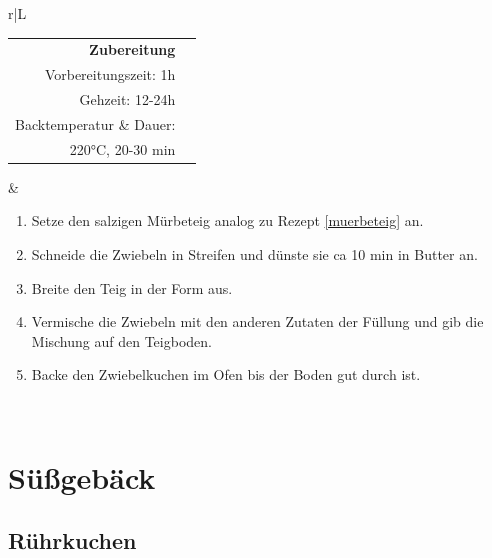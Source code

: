 \documentclass[a4paper, 12pt]{scrbook} 								%
\numberwithin{equation}{section} 									%
\begin{document}
\begin{tabularx}{\textwidth}{r|L}
		
			\begin{tabular}[t]{rr}
				\textbf{Zubereitung}	\\
				\small Vorbereitungszeit: 1h	\\
				\small Gehzeit: 12-24h \\
				\small Backtemperatur \& Dauer:	\\
				220°C, 20-30 min	\\
			\end{tabular}			&	\begin{enumerate}[]
											\item Setze den salzigen Mürbeteig analog zu Rezept \ref{muerbeteig} an.
											\item Schneide die Zwiebeln in Streifen und dünste sie ca 10 min in Butter an.
											\item Breite den Teig in der Form aus.
											\item Vermische die Zwiebeln mit den anderen Zutaten der Füllung und gib die Mischung auf den Teigboden.
											\item Backe den Zwiebelkuchen im Ofen bis der Boden gut durch ist.
										\end{enumerate}	\\
		\end{tabularx}
		\newpage


	\section{Süßgebäck}
	\newpage


		\subsection{Rührkuchen}	\label{ruehrkuchen}
\end{document}
